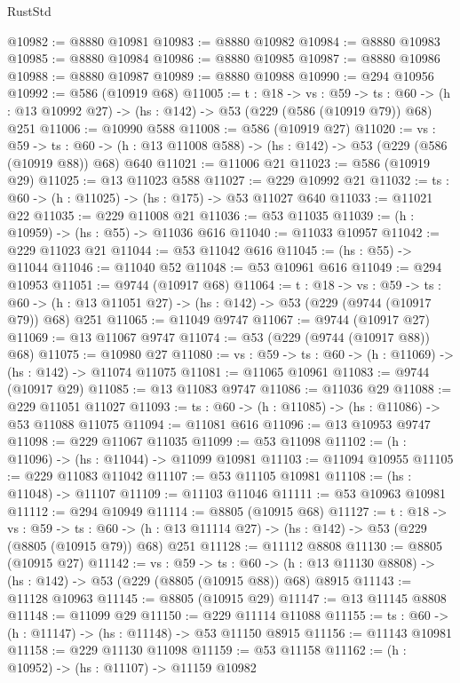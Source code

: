 \begin{lexlean}{RustStd}
\begin{coremodule}
@10982 := @8880 @10981
@10983 := @8880 @10982
@10984 := @8880 @10983
@10985 := @8880 @10984
@10986 := @8880 @10985
@10987 := @8880 @10986
@10988 := @8880 @10987
@10989 := @8880 @10988
@10990 := @294 @10956
@10992 := @586 (@10919 @68)
@11005 := {t : @18} ->
  {vs : @59} ->
  {ts : @60} -> (h : @13 @10992 @27) -> (hs : @142) -> @53 (@229 (@586 (@10919 @79)) @68) @251
@11006 := @10990 @588
@11008 := @586 (@10919 @27)
@11020 := {vs : @59} ->
  {ts : @60} -> (h : @13 @11008 @588) -> (hs : @142) -> @53 (@229 (@586 (@10919 @88)) @68) @640
@11021 := @11006 @21
@11023 := @586 (@10919 @29)
@11025 := @13 @11023 @588
@11027 := @229 @10992 @21
@11032 := {ts : @60} -> (h : @11025) -> (hs : @175) -> @53 @11027 @640
@11033 := @11021 @22
@11035 := @229 @11008 @21
@11036 := @53 @11035
@11039 := (h : @10959) -> (hs : @55) -> @11036 @616
@11040 := @11033 @10957
@11042 := @229 @11023 @21
@11044 := @53 @11042 @616
@11045 := (hs : @55) -> @11044
@11046 := @11040 @52
@11048 := @53 @10961 @616
@11049 := @294 @10953
@11051 := @9744 (@10917 @68)
@11064 := {t : @18} ->
  {vs : @59} ->
  {ts : @60} -> (h : @13 @11051 @27) -> (hs : @142) -> @53 (@229 (@9744 (@10917 @79)) @68) @251
@11065 := @11049 @9747
@11067 := @9744 (@10917 @27)
@11069 := @13 @11067 @9747
@11074 := @53 (@229 (@9744 (@10917 @88)) @68)
@11075 := @10980 @27
@11080 := {vs : @59} -> {ts : @60} -> (h : @11069) -> (hs : @142) -> @11074 @11075
@11081 := @11065 @10961
@11083 := @9744 (@10917 @29)
@11085 := @13 @11083 @9747
@11086 := @11036 @29
@11088 := @229 @11051 @11027
@11093 := {ts : @60} -> (h : @11085) -> (hs : @11086) -> @53 @11088 @11075
@11094 := @11081 @616
@11096 := @13 @10953 @9747
@11098 := @229 @11067 @11035
@11099 := @53 @11098
@11102 := (h : @11096) -> (hs : @11044) -> @11099 @10981
@11103 := @11094 @10955
@11105 := @229 @11083 @11042
@11107 := @53 @11105 @10981
@11108 := (hs : @11048) -> @11107
@11109 := @11103 @11046
@11111 := @53 @10963 @10981
@11112 := @294 @10949
@11114 := @8805 (@10915 @68)
@11127 := {t : @18} ->
  {vs : @59} ->
  {ts : @60} -> (h : @13 @11114 @27) -> (hs : @142) -> @53 (@229 (@8805 (@10915 @79)) @68) @251
@11128 := @11112 @8808
@11130 := @8805 (@10915 @27)
@11142 := {vs : @59} ->
  {ts : @60} -> (h : @13 @11130 @8808) -> (hs : @142) -> @53 (@229 (@8805 (@10915 @88)) @68) @8915
@11143 := @11128 @10963
@11145 := @8805 (@10915 @29)
@11147 := @13 @11145 @8808
@11148 := @11099 @29
@11150 := @229 @11114 @11088
@11155 := {ts : @60} -> (h : @11147) -> (hs : @11148) -> @53 @11150 @8915
@11156 := @11143 @10981
@11158 := @229 @11130 @11098
@11159 := @53 @11158
@11162 := (h : @10952) -> (hs : @11107) -> @11159 @10982

\end{coremodule}
\end{lexlean}
